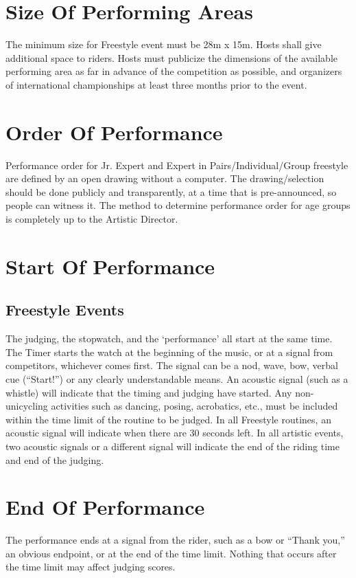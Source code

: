 \section{Size Of Performing Areas}
The minimum size for Freestyle event must be 28m x 15m.
Hosts shall give additional space to riders.
Hosts must publicize the dimensions of the available performing area as far in advance of the competition as possible, and organizers of international championships at least three months prior to the event.

\section{Order Of Performance}
Performance order for Jr. Expert and Expert in Pairs/Individual/Group freestyle are defined by an open drawing without a computer.
The drawing/selection should be done publicly and transparently, at a time that is pre-announced, so people can witness it.
The method to determine performance order for age groups is completely up to the Artistic Director.

\section{Start Of Performance}

\subsection{Freestyle Events}
The judging, the stopwatch, and the `performance' all start at the same time.
The Timer starts the watch at the beginning of the music, or at a signal from competitors, whichever comes first.
The signal can be a nod, wave, bow, verbal cue (``Start!'') or any clearly understandable means.
An acoustic signal (such as a whistle) will indicate that the timing and judging have started.
Any non-unicycling activities such as dancing, posing, acrobatics, etc., must be included within the time limit of the routine to be judged.
In all Freestyle routines, an acoustic signal will indicate when there are 30 seconds left.
In all artistic events, two acoustic signals or a different signal will indicate the end of the riding time and end of the judging.

\section{End Of Performance}
The performance ends at a signal from the rider, such as a bow or ``Thank you,'' an obvious endpoint, or at the end of the time limit.
Nothing that occurs after the time limit may affect judging scores.

